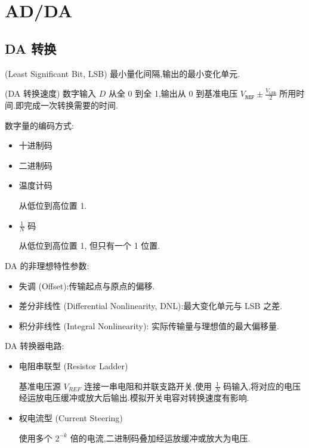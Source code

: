 
\usepackage{../../lectures_preamble}


    \section{AD/DA}
    \subsection{DA 转换}
    \begin{definition}
        (Least Significant Bit, LSB) 最小量化间隔,输出的最小变化单元.
    \end{definition}
    \begin{definition}
        (DA 转换速度) 数字输入 $D$ 从全 0 到全 1,输出从 0 到基准电压 $V_{\texttt{REF}}\pm \frac{V_{\texttt{LSB}}}{2}$ 所用时间.即完成一次转换需要的时间.
    \end{definition}
    数字量的编码方式:
    \begin{itemize}
        \item 十进制码
        \item 二进制码
        \item 温度计码

            从低位到高位置 1.
        \item $\frac{1}{N}$ 码

            从低位到高位置 1, 但只有一个 1 位置.
    \end{itemize}
    DA 的非理想特性参数:
    \begin{itemize}
        \item 失调 (Offset):传输起点与原点的偏移.
        \item 差分非线性 (Differential Nonlinearity, DNL):最大变化单元与 LSB 之差.
        \item 积分非线性 (Integral Nonlinearity): 实际传输量与理想值的最大偏移量.
    \end{itemize}
    DA 转换器电路:
    \begin{itemize}
        \item 电阻串联型 (Resistor Ladder)

            基准电压源 $V_{REF}$ 连接一串电阻和并联支路开关,使用 $\frac{1}{N}$ 码输入,将对应的电压经运放电压缓冲或放大后输出.模拟开关电容对转换速度有影响.

        \item 权电流型 (Current Steering)

            使用多个 $2^{-k}$ 倍的电流,二进制码叠加经运放缓冲或放大为电压.
    \end{itemize}

